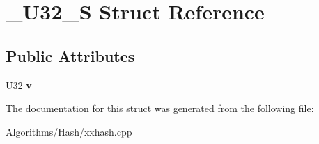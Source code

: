 \hypertarget{struct__U32__S}{\section{\-\_\-\-U32\-\_\-\-S Struct Reference}
\label{struct__U32__S}
}
\subsection*{Public Attributes}
\begin{DoxyCompactItemize}
\item 
\hypertarget{struct__U32__S_a9e62321efa6315b0fb8b252add8029b4}{U32 {\bfseries v}}\label{struct__U32__S_a9e62321efa6315b0fb8b252add8029b4}

\end{DoxyCompactItemize}


The documentation for this struct was generated from the following file\-:\begin{DoxyCompactItemize}
\item 
Algorithms/\-Hash/xxhash.\-cpp\end{DoxyCompactItemize}
